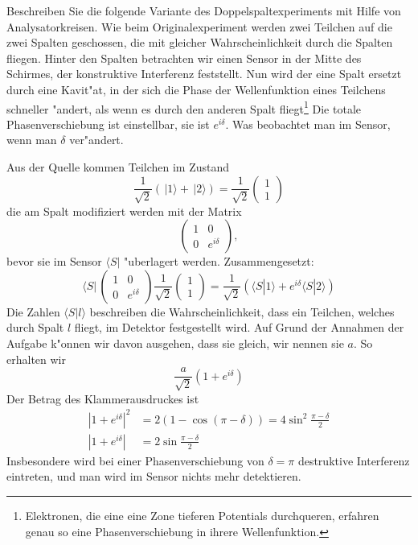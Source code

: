 Beschreiben Sie die folgende Variante des Doppelspaltexperiments mit Hilfe 
von Analysatorkreisen.
Wie beim Originalexperiment werden zwei Teilchen auf die zwei Spalten
geschossen, die mit gleicher Wahrscheinlichkeit durch die Spalten fliegen.
Hinter den Spalten betrachten wir einen Sensor in der Mitte des Schirmes,
der konstruktive Interferenz feststellt.
Nun wird der eine Spalt ersetzt durch eine Kavit"at, in der sich die Phase
der Wellenfunktion eines Teilchens schneller "andert, als wenn es durch
den anderen Spalt fliegt\footnote{Elektronen, die eine eine Zone tieferen
Potentials durchqueren, erfahren genau so eine Phasenverschiebung in
ihrere Wellenfunktion.}
Die totale Phasenverschiebung ist einstellbar, sie ist $e^{i\delta}$.
Was beobachtet man im Sensor, wenn man $\delta$ ver"andert.

\begin{loesung}
Aus der Quelle kommen Teilchen im Zustand
\[
\frac1{\sqrt{2}}(\,|1\rangle+\,|2\rangle)
=
\frac1{\sqrt{2}}
\begin{pmatrix}
1\\1
\end{pmatrix}
\]
die am Spalt modifiziert werden mit der Matrix
\[
\begin{pmatrix}
1&0\\
0&e^{i\delta}
\end{pmatrix},
\]
bevor sie im Sensor $\langle S|$ "uberlagert werden.
Zusammengesetzt:
\[
\langle S|\,
\begin{pmatrix}
1&0\\
0&e^{i\delta}
\end{pmatrix}
\frac1{\sqrt{2}}
\begin{pmatrix}
1\\1
\end{pmatrix}
=
\frac1{\sqrt{2}}(
\langle S|1\rangle + e^{i\delta}\langle S|2\rangle
)
\]
Die Zahlen
$\langle S|l\rangle$
beschreiben die Wahrscheinlichkeit, dass ein Teilchen, welches durch
Spalt $l$ fliegt, im Detektor festgestellt wird.
Auf Grund der Annahmen der Aufgabe k"onnen wir davon ausgehen, dass
sie gleich, wir nennen sie $a$. So erhalten wir
\[
\frac{a}{\sqrt{2}}(1+e^{i\delta})
\]
Der Betrag des Klammerausdruckes ist
\begin{align*}
|1+e^{i\delta}|^2
&=2(1-\cos(\pi-\delta))
=4\sin^2\frac{\pi-\delta}2
\\
|1+e^{i\delta}|
&=
2\sin\frac{\pi-\delta}2
\end{align*}
Insbesondere wird bei einer Phasenverschiebung von $\delta=\pi$ 
destruktive Interferenz eintreten, und man wird im Sensor nichts
mehr detektieren.
\end{loesung}

